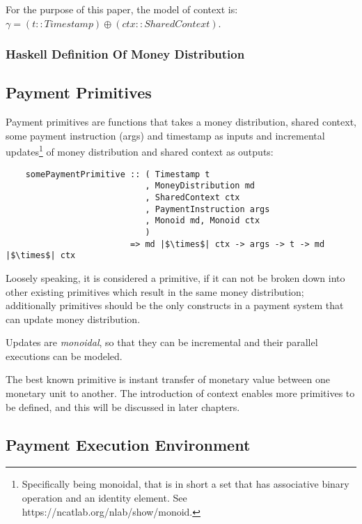 For the purpose of this paper, the model of context is: $\gamma = (t :: Timestamp) \oplus (ctx :: SharedContext)$.

\subsubsection{Haskell Definition Of Money Distribution}




\subsection{Payment Primitives}

Payment primitives are functions that takes a money distribution, shared context, some payment instruction (args) and
timestamp as inputs and incremental updates\footnote{Specifically being monoidal, that is in short a set that has
associative binary operation and an identity element. See https://ncatlab.org/nlab/show/monoid. } of money
distribution and shared context as outputs:

\begin{verbatim}
    somePaymentPrimitive :: ( Timestamp t
                            , MoneyDistribution md
                            , SharedContext ctx
                            , PaymentInstruction args
                            , Monoid md, Monoid ctx
                            )
                         => md |$\times$| ctx -> args -> t -> md |$\times$| ctx
\end{verbatim}

Loosely speaking, it is considered a primitive, if it can not be broken down into other existing primitives which result
in the same money distribution; additionally primitives should be the only constructs in a payment system that can
update money distribution.

Updates are \textit{monoidal}, so that they can be incremental and their parallel executions can be modeled.

The best known primitive is instant transfer of monetary value between one monetary unit to another. The introduction of
context enables more primitives to be defined, and this will be discussed in later chapters.


\subsection{Payment Execution Environment}

